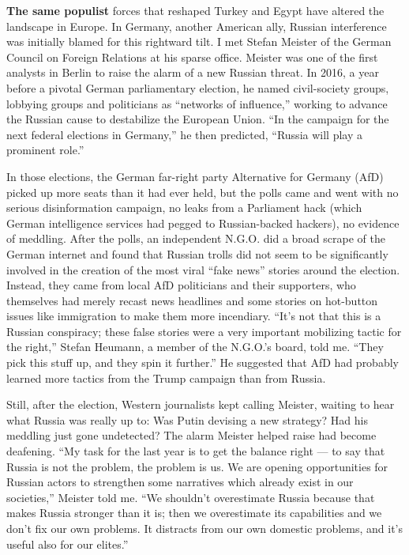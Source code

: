 \textbf{The same populist} forces that reshaped Turkey and Egypt have
altered the landscape in Europe. In Germany, another American ally,
Russian interference was initially blamed for this rightward tilt. I met
Stefan Meister of the German Council on Foreign Relations at his sparse
office. Meister was one of the first analysts in Berlin to raise the
alarm of a new Russian threat. In 2016, a year before a pivotal German
parliamentary election, he named civil-society groups, lobbying groups
and politicians as ``networks of influence,'' working to advance the
Russian cause to destabilize the European Union. ``In the campaign for
the next federal elections in Germany,'' he then predicted, ``Russia
will play a prominent role.''

In those elections, the German far-right party Alternative for Germany
(AfD) picked up more seats than it had ever held, but the polls came and
went with no serious disinformation campaign, no leaks from a Parliament
hack (which German intelligence services had pegged to Russian-backed
hackers), no evidence of meddling. After the polls, an independent
N.G.O. did a broad scrape of the German internet and found that Russian
trolls did not seem to be significantly involved in the creation of the
most viral ``fake news'' stories around the election. Instead, they came
from local AfD politicians and their supporters, who themselves had
merely recast news headlines and some stories on hot-button issues like
immigration to make them more incendiary. ``It's not that this is a
Russian conspiracy; these false stories were a very important mobilizing
tactic for the right,'' Stefan Heumann, a member of the N.G.O.'s board,
told me. ``They pick this stuff up, and they spin it further.'' He
suggested that AfD had probably learned more tactics from the Trump
campaign than from Russia.

Still, after the election, Western journalists kept calling Meister,
waiting to hear what Russia was really up to: Was Putin devising a new
strategy? Had his meddling just gone undetected? The alarm Meister
helped raise had become deafening. ``My task for the last year is to get
the balance right --- to say that Russia is not the problem, the problem
is us. We are opening opportunities for Russian actors to strengthen
some narratives which already exist in our societies,'' Meister told me.
``We shouldn't overestimate Russia because that makes Russia stronger
than it is; then we overestimate its capabilities and we don't fix our
own problems. It distracts from our own domestic problems, and it's
useful also for our elites.''


